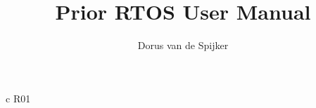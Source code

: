 \documentclass[a4paper]{prodrive/user_manual}
\title{Prior RTOS User Manual}
\author{Dorus van de Spijker}
\begin{document}
\maketitle


\begin{pddocumenthistory}
\end{pddocumenthistory}



\pagebreak

\begin{pddistributionlist}{c }          { R01 }
\end{pddistributionlist}



\begin{pdissues}
\end{pdissues}


\pdtableofcontents
\pdlistoffigures
\pdlistoftables
\pdlistoflistings


%

















\pdappendix
%
%
%
%
%
%
%
%

%
%
\end{document}
